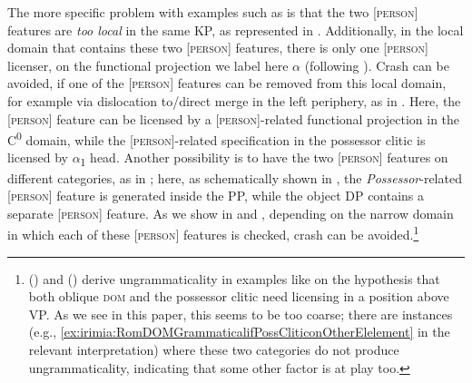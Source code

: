 \documentclass[output=paper,colorlinks,citecolor=brown,draft,draftmode]{langscibook}
\begin{document}
\hspace*{-1pt}The more specific problem with examples such as  is that the two [\textsc{person}] features are \textit{too local} in the same KP, as represented in . Additionally, in the local domain that contains these two [\textsc{person}] features, there is only one [\textsc{person}] licenser, on the functional projection we label here $\alpha$ (following \citeauthor{lopez12} \citeyear{lopez12}). Crash can be avoided, if one of the [\textsc{person}] features can be removed from this local domain, for example via dislocation to/direct merge in the left periphery, as in . Here, the [\textsc{person}] feature can be licensed by a [\textsc{person}]-related functional projection in the C\textsuperscript{0} domain, while the [\textsc{person}]-related specification in the possessor clitic is licensed by $\alpha$\textsubscript{1} head. Another possibility is to have the two [\textsc{person}] features on different categories, as in ; here, as schematically shown in , the \textit{Possessor}-related [\textsc{person}] feature is generated inside the PP, while the object DP contains a separate [\textsc{person}] feature. As we show in  and , depending on the narrow domain in which each of these [\textsc{person}] features is checked, crash can be avoided.\footnote{ \citeauthor{oneahole2017} (\citeyear{oneahole2017}) and
\citeauthor{onea2018} (\citeyear{onea2018}) derive ungrammaticality in examples like  on the hypothesis that both oblique \textsc{dom} and the possessor clitic need licensing in a position above VP. As we see in this paper, this seems to be too coarse; there are instances (e.g., \ref{ex:irimia:RomDOMGrammaticalifPossCliticonOtherElelement} in the relevant interpretation) where these two categories do not produce ungrammaticality, indicating that some other factor is at play too. }
\end{document}
